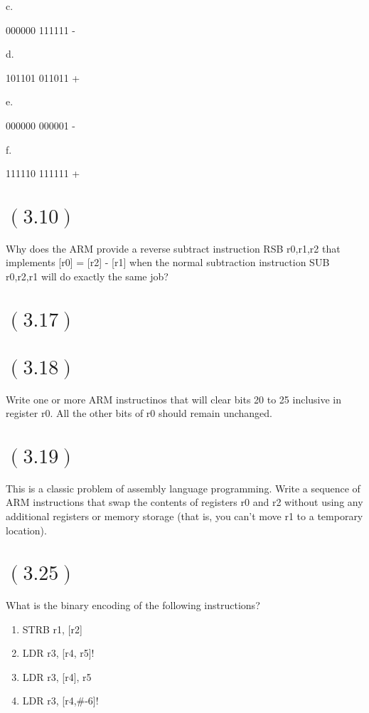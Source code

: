 \documentclass[letterpaper,12pt,titlepage]{article}
\begin{document}
c.

000000
111111
-

d. 

101101
011011
+

e.

000000
000001
-

f.

111110
111111
+

\section*{$(3.10)$} Why does the ARM provide a reverse subtract instruction RSB r0,r1,r2 that implements [r0] = [r2] - [r1] when the normal subtraction instruction SUB r0,r2,r1 will do exactly the same job?

\section*{$(3.17)$} 

\section*{$(3.18)$} Write one or more ARM instructinos that will clear bits 20 to 25 inclusive in register r0. All the other bits of r0 should remain unchanged.

\section*{$(3.19)$} This is a classic problem of assembly language programming. Write a sequence of ARM instructions that swap the contents of registers r0 and r2 without using any additional registers or memory storage (that is, you can't move r1 to a temporary location).

\section*{$(3.25)$} What is the binary encoding of the following instructions?


\renewcommand{\labelenumi}{\alph{enumi})}
\begin{enumerate}

\item STRB r1, [r2]

\item LDR r3, [r4, r5]!

\item LDR r3, [r4], r5

\item LDR r3, [r4,\#-6]!

\end{enumerate}
\end{document}
